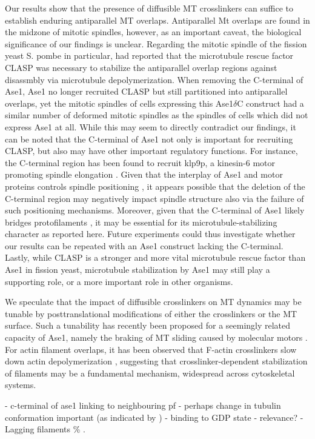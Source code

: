 Our results show that the presence of diffusible MT crosslinkers can suffice to establish enduring antiparallel MT overlaps. Antiparallel Mt overlaps are found in the midzone of mitotic spindles, however, as an important caveat, the biological significance of our findings is unclear. Regarding the mitotic spindle of the fission yeast S. pombe in particular, \cite{Bratman2007b} had reported that the microtubule rescue factor CLASP was necessary to stabilize the antiparallel overlap regions against disassmbly via microtubule depolymerization. When removing the C-terminal of Ase1, Ase1 no longer recruited CLASP but still partitioned into antiparallel overlaps, yet the mitotic spindles of cells expressing this Ase1$\delta$C construct had a similar number of deformed mitotic spindles as the spindles of cells which did not express Ase1 at all. While this may seem to directly contradict our findings, it can be noted that the C-terminal of Ase1 not only is important for recruiting CLASP, but also may have other important regulatory functions. For instance, the C-terminal region has been found to recruit klp9p, a kinesin-6 motor promoting spindle elongation . Given that the interplay of Ase1 and motor proteins controls spindle positioning , it appears possible that the deletion of the C-terminal region may negatively impact spindle structure also via the failure of such positioning mechanisms. Moreover, given that the C-terminal of Ase1 likely bridges protofilaments , it may be essential for its microtubule-stabilizing character as reported here. Future experiments could thus investigate whether our results can be repeated with an Ase1 construct lacking the C-terminal. Lastly, while CLASP is a stronger and more vital microtubule rescue factor than Ase1 in fission yeast, microtubule stabilization by Ase1 may still play a supporting role, or a more important role in other organisms. \par

We speculate that the impact of diffusible crosslinkers on MT dynamics may be tunable by posttranslational modifications of either the crosslinkers or the MT surface. Such a tunability has recently been proposed for a seemingly related capacity of Ase1, namely the braking of MT sliding caused by molecular motors \parencite{fu2009phospho, Thomas2020}. For actin filament overlaps, it has been observed that F-actin crosslinkers slow down actin depolymerization \parencite{maul2003eplin,schmoller2011slow}, suggesting that crosslinker-dependent stabilization of filaments may be a fundamental mechanism, widespread across cytoskeletal systems.


- c-terminal of ase1 linking to neighbouring pf 
- perhaps change in tubulin conformation important (as indicated by )
- binding to GDP state - relevance?
- Lagging filaments \% . 